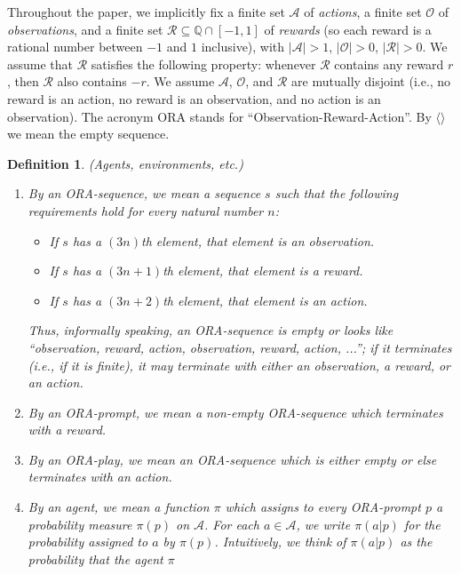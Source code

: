 \documentclass{article}
\newtheorem{definition}[theorem]{Definition}
\begin{document}
Throughout the paper, we implicitly
fix a finite set $\mathcal A$ of \emph{actions},
a finite set $\mathcal O$ of \emph{observations},
and a finite set $\mathcal R\subseteq \mathbb Q\cap [-1,1]$ of \emph{rewards}
(so each reward is a rational number between $-1$ and $1$ inclusive),
with $|\mathcal A|>1$,
$|\mathcal O|>0$, $|\mathcal R|>0$.
We assume that $\mathcal R$ satisfies the following property:
whenever $\mathcal R$ contains any reward $r$, then $\mathcal R$
also contains $-r$.
We assume $\mathcal A$, $\mathcal O$, and $\mathcal R$ are mutually disjoint
(i.e., no reward is an action, no reward is an observation, and no action is an
observation).
The acronym ORA stands for ``Observation-Reward-Action''.
By $\langle\rangle$ we mean the empty sequence.

\begin{definition}
\label{omnibusdefn}
    (Agents, environments, etc.)
    \begin{enumerate}
        \item
        By an \emph{ORA-sequence}, we mean a sequence $s$ such that the following requirements
        hold for every natural number $n$:
        \begin{itemize}
            \item If $s$ has a $(3n)$th element, that element is an observation.
            \item If $s$ has a $(3n+1)$th element, that element is a reward.
            \item If $s$ has a $(3n+2)$th element, that element is an action.
        \end{itemize}
        Thus, informally speaking, an ORA-sequence is empty or
        looks like ``observation, reward, action, observation, reward, action, ...'';
        if it terminates (i.e., if it is finite), it may terminate with
        either an observation, a reward, or an action.
        \item
        By an \emph{ORA-prompt}, we mean a non-empty ORA-sequence which
        terminates with a reward.
        \item
        By an \emph{ORA-play}, we mean an ORA-sequence which is either empty or else
        terminates with an action.
        \item
        By an \emph{agent}, we mean a function $\pi$ which assigns to every
        ORA-prompt $p$ a probability measure $\pi(p)$ on $\mathcal A$.
        For each $a\in\mathcal A$,
        we write $\pi(a|p)$ for the probability assigned to $a$ by $\pi(p)$.
        Intuitively, we think of $\pi(a|p)$ as the probability that the agent $\pi$

\end{enumerate}
\end{definition}
\end{document}
